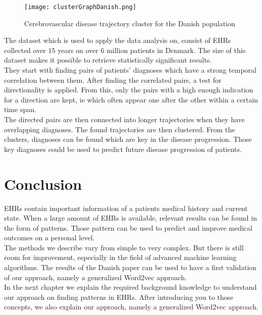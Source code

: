 \begin{figure}[!htb]
	\centering
	\texttt{[image: clusterGraphDanish.png]}
	\caption{Cerebrovascular disease trajectory cluster for the Danish population \cite{Brunak:article}}
	\label{fig:clusterGraphDanish}
\end{figure}

The dataset which is used to apply the data analysis on, consist of EHRs collected over $15$ years on over $6$ million patients in Denmark. The size of this dataset makes it possible to retrieve statistically significant results. \\

They start with finding pairs of patients' diagnoses which have a strong temporal correlation between them. After finding the correlated pairs, a test for directionality is applied. From this, only the pairs with a high enough indication for a direction are kept, ie which often appear one after the other within a certain time span. \\

The directed pairs are then connected into longer trajectories when they have overlapping diagnoses. The found trajectories are then clustered. From the clusters, diagnoses can be found which are key in the disease progression. Those key diagnoses could be used to predict future disease progression of patients. 


\section{Conclusion}

EHRs contain important information of a patients medical history and current state. When a large amount of EHRs is available, relevant results can be found in the form of patterns. Those pattern can be used to predict and improve medical outcomes on a personal level. \\
The methods we describe vary from simple to very complex. But there is still room for improvement, especially in the field of advanced machine learning algorithms. The results of the Danish paper can be used to have a first validation of our approach, namely a generalized Word2vec approach. \\

In the next chapter we explain the required background knowledge to understand our approach on finding patterns in EHRs. After introducing you to those concepts, we also explain our approach, namely a generalized Word2vec approach.



